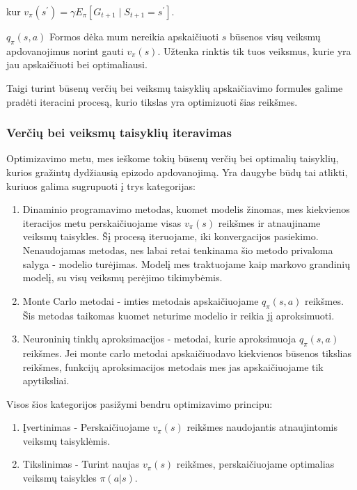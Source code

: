 \documentclass[a4paper, 12pt]{article}
\begin{document}
kur $v_{\pi}(s^{\prime}) = \gamma E_{\pi}\left[G_{t+1} \mid S_{t+1}=s^{\prime}\right]$.

$q_{\pi}(s, a)$ Formos dėka mum nereikia apskaičiuoti $s$ būsenos visų veiksmų apdovanojimus norint gauti $v_{\pi}(s)$. Užtenka rinktis tik tuos veiksmus, kurie yra jau apskaičiuoti bei optimaliausi.

Taigi turint būsenų verčių bei veiksmų taisyklių apskaičiavimo formules galime pradėti iteracini procesą, kurio tikslas yra optimizuoti šias reikšmes.

\subsubsection{Verčių bei veiksmų taisyklių iteravimas}

Optimizavimo metu, mes ieškome tokių būsenų verčių bei optimalių taisyklių, kurios gražintų dydžiausią epizodo apdovanojimą.
Yra daugybe būdų tai atlikti, kuriuos galima sugrupuoti į trys kategorijas:

\begin{enumerate}
  \addtolength{\itemsep}{-0.5\baselineskip} 
  \item Dinaminio programavimo metodas, kuomet modelis žinomas, mes kiekvienos iteracijos metu perskaičiuojame visas $v_{\pi}(s)$ reikšmes ir atnaujiname veiksmų taisykles. Šį procesą iteruojame, iki konvergacijos pasiekimo. Nenaudojamas metodas, nes labai retai tenkinama šio metodo privaloma salyga - modelio turėjimas. Modelį mes traktuojame kaip markovo grandinių modelį, su visų veiksmų perėjimo tikimybėmis.
  \item Monte Carlo metodai - imties metodais apskaičiuojame $q_{\pi}(s, a)$ reikšmes. Šis metodas taikomas kuomet neturime modelio ir reikia jį aproksimuoti. 
  \item Neuroninių tinklų aproksimacijos - metodai, kurie aproksimuoja $q_{\pi}(s, a)$ reikšmes. Jei monte carlo metodai apskaičiuodavo kiekvienos būsenos tikslias reikšmes, funkcijų aproksimacijos metodais mes jas apskaičiuojame tik apytiksliai.
\end{enumerate}

Visos šios kategorijos pasižymi bendru optimizavimo principu:

\begin{enumerate}
  \addtolength{\itemsep}{-0.5\baselineskip} 
  \item Įvertinimas - Perskaičiuojame $v_{\pi}(s)$ reikšmes naudojantis atnaujintomis veiksmų taisyklėmis.
  \item Tikslinimas - Turint naujas $v_{\pi}(s)$ reikšmes, perskaičiuojame optimalias veiksmų taisykles $\pi(a|s)$.
\end{enumerate}
\end{document}
